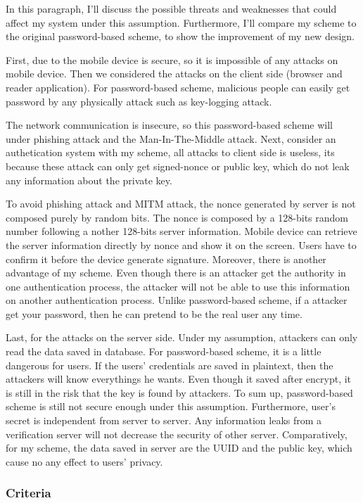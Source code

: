 \begin{CJK}{Bg5}{bsmi}
In this paragraph, I'll discuss the possible threats and weaknesses that could affect my system under this assumption. Furthermore, I'll compare my scheme to the original password-based scheme, to show the improvement of my new design.

First, due to the mobile device is secure, so it is impossible of any attacks on mobile device. Then we considered the attacks on the client side (browser and reader application). For password-based scheme, malicious people can easily get password by any physically attack such as key-logging attack. 

The network communication is insecure, so this password-based scheme will under phishing attack and the Man-In-The-Middle attack. Next, consider an authetication system with my scheme, all attacks to client side is useless, its because these attack can only get signed-nonce or public key, which do not leak any information about the private key. 

To avoid phishing attack and MITM attack, the nonce generated by server is not composed purely by random bits. The nonce is composed by a 128-bits random number following a nother 128-bits server information. Mobile device can retrieve the server information directly by nonce and show it on the screen. Users have to confirm it before the device generate signature. Moreover, there is another advantage of my scheme. Even though there is an attacker get the authority in one authentication process, the attacker will not be able to use this information on another authentication process. Unlike password-based scheme, if a attacker get your password, then he can pretend to be the real user any time.

Last, for the attacks on the server side. Under my assumption, attackers can only read the data saved in database. For password-based scheme, it is a little dangerous for users. If the users' credentials are saved in plaintext, then the attackers will know everythings he wants. Even though it saved after encrypt, it is still in the risk that the key is found by attackers. To sum up, password-based scheme is still not secure enough under this assumption. Furthermore, user's secret is independent from server to server. Any information leaks from a verification server will not decrease the security of other server. Comparatively, for my scheme, the data saved in server are the UUID and the public key, which cause no any effect to users' privacy.

\subsubsection{Criteria}


\end{CJK}
